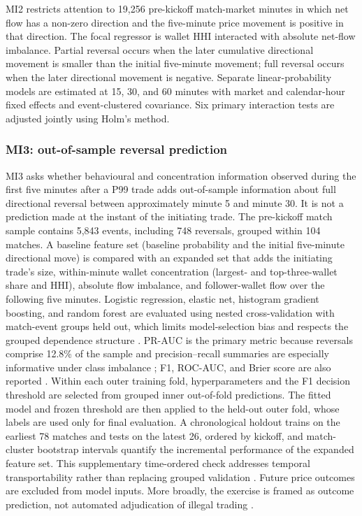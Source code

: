 MI2 restricts attention to 19,256 pre-kickoff match-market minutes in which net
flow has a non-zero direction and the five-minute price movement is positive in
that direction. The focal regressor is wallet HHI interacted with absolute
net-flow imbalance. Partial reversal occurs when the later cumulative
directional movement is smaller than the initial five-minute movement; full
reversal occurs when the later directional movement is negative. Separate
linear-probability models are estimated at 15, 30, and 60 minutes with market
and calendar-hour fixed effects and event-clustered covariance. Six primary
interaction tests are adjusted jointly using Holm's method.

\subsubsection{MI3: out-of-sample reversal prediction}

MI3 asks whether behavioural and concentration information observed during the
first five minutes after a P99 trade adds out-of-sample information about full
directional reversal between approximately minute 5 and minute 30. It is not a
prediction made at the instant of the initiating trade. The
pre-kickoff match sample contains 5,843 events, including 748 reversals, grouped
within 104 matches. A baseline feature set (baseline probability and the initial five-minute
directional move) is compared with an expanded set that adds the initiating
trade's size, within-minute wallet concentration (largest- and top-three-wallet
share and HHI), absolute flow imbalance, and follower-wallet flow over the
following five minutes. Logistic
regression, elastic net, histogram gradient boosting, and random forest are
evaluated using nested cross-validation with match-event groups held out, which
limits model-selection bias and respects the grouped dependence structure
\citep{varmasimon2006nestedcv,roberts2017blockedcv}. PR-AUC is the primary metric
because reversals comprise 12.8\% of the sample and precision--recall summaries
are especially informative under class imbalance \citep{saito2015precisionrecall};
F1, ROC-AUC, and Brier score are also reported \citep{ferro2007brier}. Within
each outer training fold, hyperparameters and the F1 decision threshold are
selected from grouped inner out-of-fold predictions. The fitted model and frozen
threshold are then applied to the held-out outer fold, whose labels are used
only for final evaluation. A chronological holdout trains
on the earliest 78 matches and tests on the latest 26, ordered by kickoff, and
match-cluster bootstrap intervals quantify the incremental performance of the
expanded feature set. This supplementary time-ordered check addresses temporal
transportability rather than replacing grouped validation \citep{bergmeir2018timeseriescv}.
Future price outcomes are excluded from model inputs. More broadly, the exercise
is framed as outcome prediction, not automated adjudication of illegal trading
\citep{james2023illegaltrading}.

